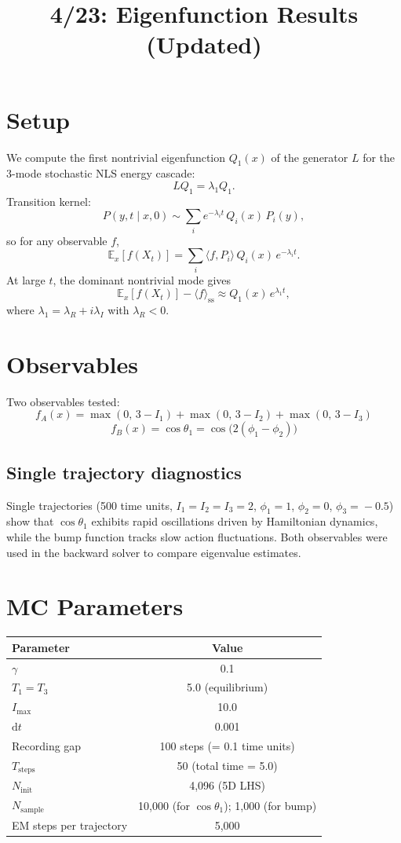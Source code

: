 \documentclass[11pt]{article}
\title{4/23: Eigenfunction Results (Updated)}
\author{}
\date{}
\begin{document}
\maketitle

\section{Setup}

We compute the first nontrivial eigenfunction $Q_1(x)$ of the generator $L$ for the 3-mode stochastic NLS energy cascade:
\[
L Q_1 = \lambda_1 Q_1.
\]
Transition kernel:
\[
P(y, t \mid x, 0) \sim \sum_i e^{-\lambda_i t}\, Q_i(x)\, P_i(y),
\]
so for any observable $f$,
\[
\mathbb{E}_x[f(X_t)] = \sum_i \langle f, P_i \rangle\, Q_i(x)\, e^{-\lambda_i t}.
\]
At large $t$, the dominant nontrivial mode gives
\[
\mathbb{E}_x[f(X_t)] - \langle f \rangle_{\mathrm{ss}} \approx Q_1(x)\, e^{\lambda_1 t},
\]
where $\lambda_1 = \lambda_R + i\lambda_I$ with $\lambda_R < 0$.

\section{Observables}

Two observables tested:
\[
f_A(x) = \max(0,\, 3 - I_1) + \max(0,\, 3 - I_2) + \max(0,\, 3 - I_3)
\]
\[
f_B(x) = \cos\theta_1 = \cos\bigl(2(\phi_1 - \phi_2)\bigr)
\]

\subsection{Single trajectory diagnostics}

Single trajectories (500 time units, $I_1\!=\!I_2\!=\!I_3\!=\!2$, $\phi_1\!=\!1$, $\phi_2\!=\!0$, $\phi_3\!=\!-0.5$) show that $\cos\theta_1$ exhibits rapid oscillations driven by Hamiltonian dynamics, while the bump function tracks slow action fluctuations. Both observables were used in the backward solver to compare eigenvalue estimates.

\section{MC Parameters}

\begin{center}
\begin{tabular}{lc}
\toprule
Parameter & Value \\
\midrule
$\gamma$ & 0.1 \\
$T_1 = T_3$ & 5.0 (equilibrium) \\
$I_{\max}$ & 10.0 \\
$\mathrm{d}t$ & 0.001 \\
Recording gap & 100 steps (= 0.1 time units) \\
$T_{\mathrm{steps}}$ & 50 (total time = 5.0) \\
$N_{\mathrm{init}}$ & 4,096 (5D LHS) \\
$N_{\mathrm{sample}}$ & 10,000 (for $\cos\theta_1$); 1,000 (for bump) \\
EM steps per trajectory & 5,000 \\
\bottomrule
\end{tabular}
\end{center}
\end{document}
